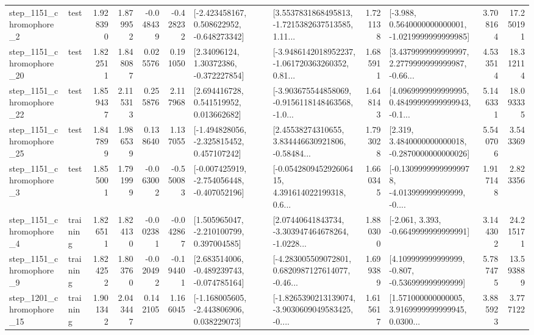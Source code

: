 \begin{tabular}{llrrrrllrlrr}
  step\_1151\_chromophore\_2 &      test &      1.928390 &    1.879952 &     -0.048439 & -0.428232 &   [-2.423458167, 0.508622952, -0.648273342] &  [3.5537831868495813, -1.7215382637513585, 1.11... &       1.721138 &  [-3.988, 0.5640000000000001, -1.0219999999999985] &            3.708164 &         17.250191 \\
 step\_1151\_chromophore\_20 &      test &      1.822511 &    1.848087 &      0.025576 &  0.191050 &      [2.34096124, 1.30372386, -0.372227854] &  [-3.9486142018952237, -1.061720363260352, 0.81... &       1.685911 &  [3.4379999999999997, 2.2779999999999987, -0.66... &            4.533514 &         18.312114 \\
 step\_1151\_chromophore\_22 &      test &      1.859437 &    2.115313 &      0.255876 &  2.117968 &     [2.694416728, 0.541519952, 0.013662682] &  [-3.903675544858069, -0.9156118148463568, -1.0... &       1.648143 &  [4.0969999999999995, 0.48499999999999943, -0.1... &            5.146331 &         18.093335 \\
 step\_1151\_chromophore\_25 &      test &      1.847899 &    1.986539 &      0.138640 &  1.137055 &   [-1.494828056, -2.325815452, 0.457107242] &  [2.45538274310655, 3.834446630921806, -0.58484... &       1.793028 &   [2.319, 3.4840000000000018, -0.2870000000000026] &            5.540706 &          3.543369 \\
  step\_1151\_chromophore\_3 &      test &      1.855001 &    1.791999 &     -0.063002 & -0.550083 &  [-0.007425919, -2.754056448, -0.407052196] &  [-0.054280945292606415, 4.391614022199318, 0.6... &       1.660345 &  [-0.13099999999999978, -4.013999999999999, -0.... &            1.917148 &          2.823356 \\
  step\_1151\_chromophore\_4 &  training &      1.826511 &    1.824130 &     -0.002381 & -0.042867 &    [1.505965047, -2.210100799, 0.397004585] &  [2.07440641843734, -3.303947464678264, -1.0228... &       1.880300 &               [-2.061, 3.393, -0.6649999999999991] &            3.144302 &         24.215171 \\
  step\_1151\_chromophore\_9 &  training &      1.824252 &    1.803760 &     -0.020492 & -0.194401 &   [2.683514006, -0.489239743, -0.074785164] &  [-4.283005509072801, 0.6820987127614077, -0.46... &       1.699389 &    [4.109999999999999, -0.807, -0.536999999999999] &            5.787475 &         13.593889 \\
 step\_1201\_chromophore\_15 &  training &      1.901342 &    2.043447 &      0.142105 &  1.166045 &   [-1.168005605, -2.443806906, 0.038229073] &  [-1.8265390213139074, -3.9030609049583425, -0.... &       1.615617 &  [1.571000000000005, 3.9169999999999945, 0.0300... &            3.885923 &          3.777122 \\

\end{tabular}
